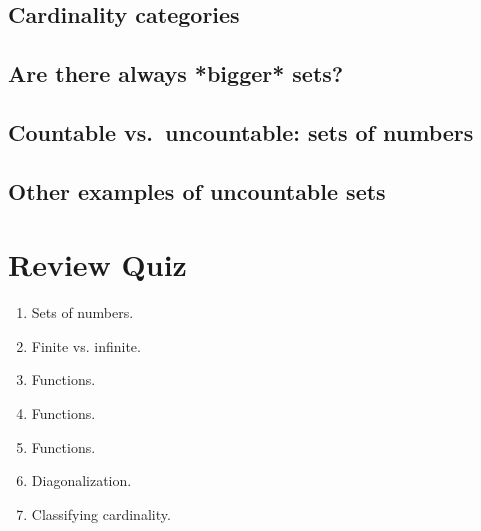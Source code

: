 \subsection*{Cardinality categories}



\subsection*{Are there always *bigger* sets?}

\newpage
\subsection*{Countable vs.\ uncountable: sets of numbers}

\subsection*{Other examples of uncountable sets}

\newpage

\section*{Review Quiz}
\begin{enumerate}
    \item Sets of numbers. \hspace{1in}\\ 
    \item Finite vs. infinite. \hspace{1in}\\ 
    \item Functions. \hspace{1in}\\ 
    \item Functions. \hspace{1in}\\  
    \item Functions. \hspace{1in}\\  
    \item Diagonalization. \hspace{1in}\\ 
    \item Classifying cardinality. \hspace{1in}\\ 
\end{enumerate}
\newpage

